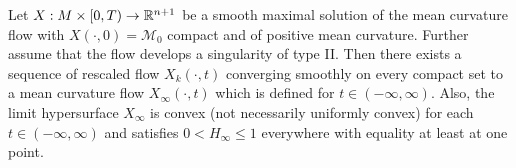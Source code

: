    \begin{thm}
        Let $ X : M \times [0,T) \to \mathbb{R}^{n+1}$ be a smooth maximal solution of the mean curvature flow with $ X(\cdot,0) = \mathcal{M}_{0} $ compact and of positive mean curvature. Further assume that the flow develops a singularity of type II. Then there exists a sequence of rescaled flow $ X_{k}(\cdot,t) $ converging smoothly on every compact set to a mean curvature flow $ X_{\infty}(\cdot, t) $ which is defined for $ t \in (-\infty, \infty) $. Also, the limit hypersurface $ X_{\infty} $ is convex (not necessarily uniformly convex) for each $ t \in (-\infty, \infty)  $ and satisfies $ 0< H_{\infty}\le 1 $ everywhere with equality at least at one point. 
    \end{thm}